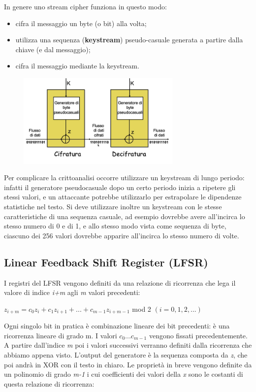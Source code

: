 In genere uno stream cipher funziona in questo modo:
\begin{itemize}
    \item cifra il messaggio un byte (o bit) alla volta;
    \item utilizza una sequenza (\textbf{keystream}) pseudo-casuale generata a partire dalla chiave (e dal messaggio);
    \item cifra il messaggio mediante la keystream.
\end{itemize}

\begin{figure}[htb!]
    \centering
    \includegraphics[width=8cm]{./Images/cap1/1.30.png}
\end{figure} 

Per complicare la crittoanalisi occorre utilizzare un keystream di lungo periodo: infatti il generatore pseudocasuale dopo un certo periodo inizia a ripetere gli stessi valori, e un attaccante potrebbe utilizzarlo per estrapolare le dipendenze statistiche nel testo. Si deve utilizzare inoltre un keystream con le stesse caratteristiche di una sequenza casuale, ad esempio dovrebbe avere all'incirca lo stesso numero di 0 e di 1, e allo stesso modo vista come sequenza di byte, ciascuno dei 256 valori dovrebbe apparire all'incirca lo stesso numero di volte.

\subsection{Linear Feedback Shift Register (LFSR)}
I registri del LFSR vengono definiti da una relazione di ricorrenza che lega il valore di indice \textit{i+m} agli \textit{m} valori precedenti:
\begin{center}
$z_{i + m} = c_{0}z_{i} + c_{1}z_{i+1} + ... + c_{m-1}z_{i+m-1}$ mod 2 $(i = 0,1,2,...)$
\end{center}



Ogni singolo bit in pratica è combinazione lineare dei bit precedenti: è una ricorrenza lineare di grado m. I valori $c_{0} ... c_{m-1}$ vengono fissati precedentemente. A partire dall'indice \textit{m} poi i valori successivi verranno definiti dalla ricorrenza che abbiamo appena visto. L'output del generatore è la sequenza composta da \textit{z}, che poi andrà in XOR con il testo in chiaro. Le proprietà in breve vengono definite da un polinomio di grado \textit{m-1} i cui coefficienti dei valori della \textit{x} sono le costanti di questa relazione di ricorrenza:

